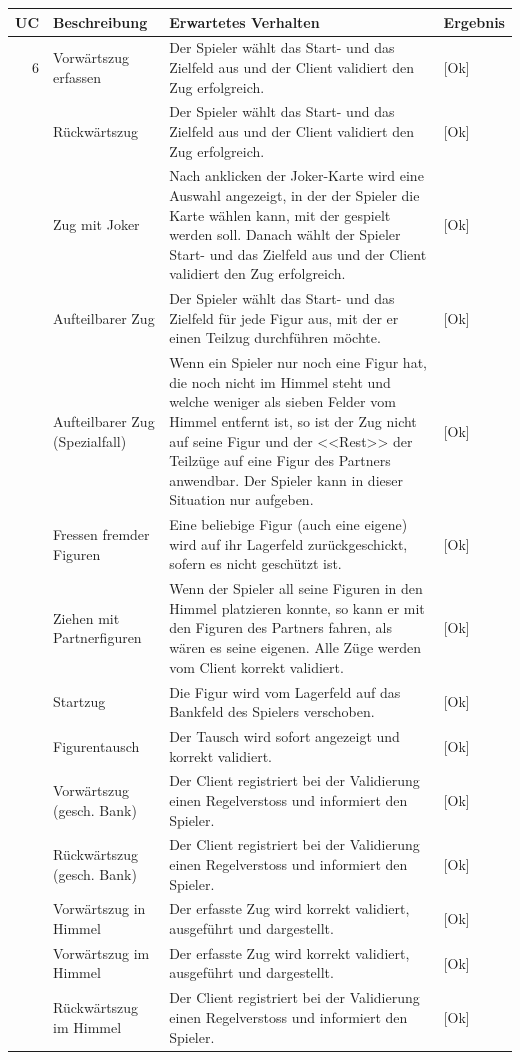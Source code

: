 \documentclass[12pt,halfparskip]{scrartcl}
\begin{document}
	\begin {tabular}{r | p{3cm} | p{9cm} | l}
		\toprule
		\textbf{UC} & \textbf{Beschreibung} & \textbf{Erwartetes Verhalten} & \textbf{Ergebnis} \\
		\midrule
		6 & Vorwärtszug erfassen & Der Spieler wählt das Start- und das Zielfeld aus und der Client validiert den Zug erfolgreich. & [Ok] \\
		\cline{3-4} & Rückwärtszug & Der Spieler wählt das Start- und das Zielfeld aus und der Client validiert den Zug erfolgreich. & [Ok] \\
		\cline{3-4} & Zug mit Joker & Nach anklicken der Joker-Karte wird eine Auswahl angezeigt, in der der Spieler die Karte wählen kann, mit der gespielt werden soll. Danach wählt der Spieler Start- und das Zielfeld aus und der Client validiert den Zug erfolgreich. & [Ok] \\
		\cline{3-4} & Aufteilbarer Zug & Der Spieler wählt das Start- und das Zielfeld für jede Figur aus, mit der er einen Teilzug durchführen möchte. & [Ok] \\
		\cline{3-4} & Aufteilbarer Zug (Spezialfall) & Wenn ein Spieler nur noch eine Figur hat, die noch nicht im Himmel steht und welche weniger als sieben Felder vom Himmel entfernt ist, so ist der Zug nicht auf seine Figur und der <<Rest>> der Teilzüge auf eine Figur des Partners anwendbar. Der Spieler kann in dieser Situation nur aufgeben. & [Ok] \\
		\cline{3-4} & Fressen fremder Figuren & Eine beliebige Figur (auch eine eigene) wird auf ihr Lagerfeld zurückgeschickt, sofern es nicht geschützt ist. & [Ok] \\
		\cline{3-4} & Ziehen mit Partnerfiguren & Wenn der Spieler all seine Figuren in den Himmel platzieren konnte, so kann er mit den Figuren des Partners fahren, als wären es seine eigenen. Alle Züge werden vom Client korrekt validiert. & [Ok] \\
		\cline{3-4} & Startzug & Die Figur wird vom Lagerfeld auf das Bankfeld des Spielers verschoben. & [Ok] \\
		\cline{3-4} & Figurentausch & Der Tausch wird sofort angezeigt und korrekt validiert. & [Ok] \\
		\cline{3-4} & Vorwärtszug (gesch. Bank) & Der Client registriert bei der Validierung einen Regelverstoss und informiert den Spieler. & [Ok] \\
		\cline{3-4} & Rückwärtszug (gesch. Bank) & Der Client registriert bei der Validierung einen Regelverstoss und informiert den Spieler. & [Ok] \\
		\cline{3-4} & Vorwärtszug in Himmel & Der erfasste Zug wird korrekt validiert, ausgeführt und dargestellt. & [Ok] \\
		\cline{3-4} & Vorwärtszug im Himmel & Der erfasste Zug wird korrekt validiert, ausgeführt und dargestellt. & [Ok] \\
		\cline{3-4} & Rückwärtszug im Himmel & Der Client registriert bei der Validierung einen Regelverstoss und informiert den Spieler. & [Ok] \\
		\bottomrule
	\end{tabular}
	
\end{document}
